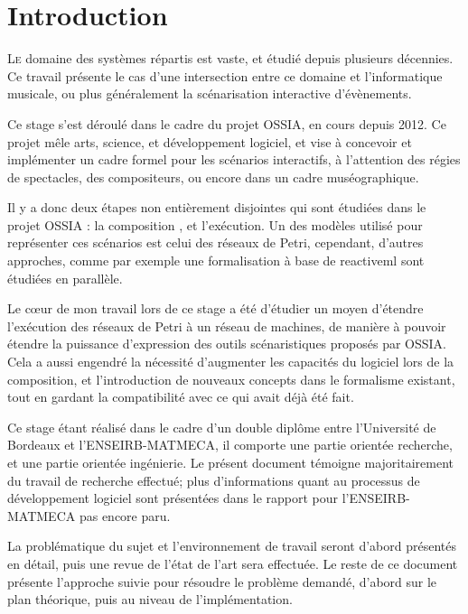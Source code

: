 \chapter*{Introduction}
\lettrine[lines=2]{L}{e} domaine des systèmes répartis est vaste, et étudié depuis plusieurs décennies. Ce travail présente le cas d'une intersection entre ce domaine et l'informatique musicale, ou plus généralement la scénarisation interactive d'évènements. 

Ce stage s'est déroulé dans le cadre du projet  \ac{OSSIA}, en cours depuis 2012. Ce projet mêle arts, science, et développement logiciel, et vise à concevoir et implémenter un cadre formel pour les scénarios interactifs, à l'attention des régies de spectacles, des compositeurs, ou encore dans un cadre muséographique. 

Il y a donc deux étapes non entièrement disjointes qui sont étudiées dans le projet \ac{OSSIA} : la composition , et l'exécution.
Un des modèles utilisé pour représenter ces scénarios est celui des réseaux de Petri, cependant, d'autres approches, comme par exemple une formalisation à base de \gls{reactiveml} sont étudiées en parallèle. 

Le cœur de mon travail lors de ce stage a été d'étudier un moyen d'étendre l'exécution des réseaux de Petri à un réseau de machines, de manière à pouvoir étendre la puissance d'expression des outils scénaristiques proposés par \ac{OSSIA}.
Cela a aussi engendré la nécessité d'augmenter les capacités du logiciel lors de la composition, et l'introduction de nouveaux concepts dans le formalisme existant, tout en gardant la compatibilité avec ce qui avait déjà été fait.

Ce stage étant réalisé dans le cadre d'un double diplôme entre l'Université de Bordeaux et l'ENSEIRB-MATMECA, il comporte une partie orientée recherche, et une partie orientée ingénierie. Le présent document témoigne majoritairement du travail de recherche effectué; plus d'informations quant au processus de développement logiciel sont présentées dans le rapport pour l'ENSEIRB-MATMECA pas encore paru.

La problématique du sujet et l'environnement de travail seront d'abord présentés en détail, puis une revue de l'état de l'art sera effectuée. Le reste de ce document présente l'approche suivie pour résoudre le problème demandé, d'abord sur le plan théorique, puis au niveau de l'implémentation.